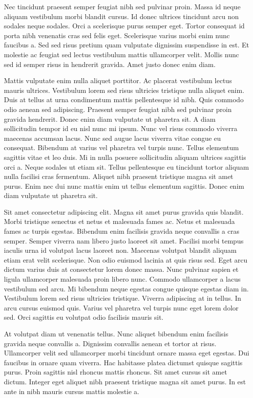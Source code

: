 Nec tincidunt praesent semper feugiat nibh sed pulvinar proin. Massa id neque aliquam vestibulum morbi blandit cursus. Id donec ultrices tincidunt arcu non sodales neque sodales. Orci a scelerisque purus semper eget. Tortor consequat id porta nibh venenatis cras sed felis eget. Scelerisque varius morbi enim nunc faucibus a. Sed sed risus pretium quam vulputate dignissim suspendisse in est. Et molestie ac feugiat sed lectus vestibulum mattis ullamcorper velit. Mollis nunc sed id semper risus in hendrerit gravida. Amet justo donec enim diam.

Mattis vulputate enim nulla aliquet porttitor. Ac placerat vestibulum lectus mauris ultrices. Vestibulum lorem sed risus ultricies tristique nulla aliquet enim. Duis at tellus at urna condimentum mattis pellentesque id nibh. Quis commodo odio aenean sed adipiscing. Praesent semper feugiat nibh sed pulvinar proin gravida hendrerit. Donec enim diam vulputate ut pharetra sit. A diam sollicitudin tempor id eu nisl nunc mi ipsum. Nunc vel risus commodo viverra maecenas accumsan lacus. Nunc sed augue lacus viverra vitae congue eu consequat. Bibendum at varius vel pharetra vel turpis nunc. Tellus elementum sagittis vitae et leo duis. Mi in nulla posuere sollicitudin aliquam ultrices sagittis orci a. Neque sodales ut etiam sit. Tellus pellentesque eu tincidunt tortor aliquam nulla facilisi cras fermentum. Aliquet nibh praesent tristique magna sit amet purus. Enim nec dui nunc mattis enim ut tellus elementum sagittis. Donec enim diam vulputate ut pharetra sit.


Sit amet consectetur adipiscing elit. Magna sit amet purus gravida quis blandit. Morbi tristique senectus et netus et malesuada fames ac. Netus et malesuada fames ac turpis egestas. Bibendum enim facilisis gravida neque convallis a cras semper. Semper viverra nam libero justo laoreet sit amet. Facilisi morbi tempus iaculis urna id volutpat lacus laoreet non. Maecenas volutpat blandit aliquam etiam erat velit scelerisque. Non odio euismod lacinia at quis risus sed. Eget arcu dictum varius duis at consectetur lorem donec massa. Nunc pulvinar sapien et ligula ullamcorper malesuada proin libero nunc. Commodo ullamcorper a lacus vestibulum sed arcu. Mi bibendum neque egestas congue quisque egestas diam in. Vestibulum lorem sed risus ultricies tristique. Viverra adipiscing at in tellus. In arcu cursus euismod quis. Varius vel pharetra vel turpis nunc eget lorem dolor sed. Orci sagittis eu volutpat odio facilisis mauris sit.

At volutpat diam ut venenatis tellus. Nunc aliquet bibendum enim facilisis gravida neque convallis a. Dignissim convallis aenean et tortor at risus. Ullamcorper velit sed ullamcorper morbi tincidunt ornare massa eget egestas. Dui faucibus in ornare quam viverra. Hac habitasse platea dictumst quisque sagittis purus. Proin sagittis nisl rhoncus mattis rhoncus. Sit amet cursus sit amet dictum. Integer eget aliquet nibh praesent tristique magna sit amet purus. In est ante in nibh mauris cursus mattis molestie a.


